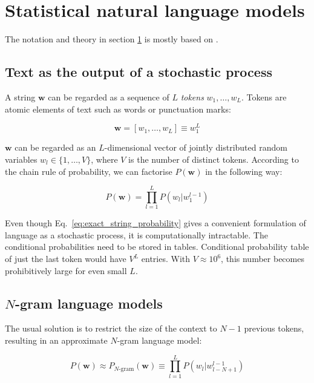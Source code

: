 \documentclass{IIBproject}
\begin{document}
\newpage
\section{Statistical natural language models}
\label{sec:snlm}

The notation and theory in section \ref{sec:snlm} is mostly based on \cite{4f11:statistical_language_models, 4f11:smt_systems, coursera:nlp}.

\subsection{Text as the output of a stochastic process}

A string $\mathbf w$ can be regarded as a sequence of $L$ \emph{tokens} $w_1, \dots, w_L$. Tokens are atomic elements of text such as words or punctuation marks:

\begin{equation}
\mathbf w = [ w_1, \dots, w_L ] \equiv w_1^L
\end{equation}

$\mathbf w$ can be regarded as an $L$-dimensional vector of jointly distributed random variables $w_l \in \{1, \dots, V\}$, where $V$ is the number of distinct tokens. According to the chain rule of probability, we can factorise $P(\mathbf w)$ in the following way:

\begin{equation}
\label{eq:exact_string_probability}
P(\mathbf w) = \prod_{l=1}^{L} P( w_l | w_1^{l-1} )
\end{equation}

Even though Eq.~\ref{eq:exact_string_probability} gives a convenient formulation of language as a stochastic process, it is computationally intractable. The conditional probabilities need to be stored in tables. Conditional probability table of just the last token would have $V^L$ entries. With $V \approx 10^6$, this number becomes prohibitively large for even small $L$.

\subsection{$N$-gram language models}

The usual solution is to restrict the size of the context to $N-1$ previous tokens, resulting in an approximate $N$-gram language model:

\begin{equation}
\label{eq:ngram_string_probability}
P(\mathbf w) \approx P_{\text{$N$-gram}}(\mathbf w) \equiv \prod_{l=1}^{L} P( w_l | w_{l-N+1}^{l-1} )
\end{equation}
\end{document}

